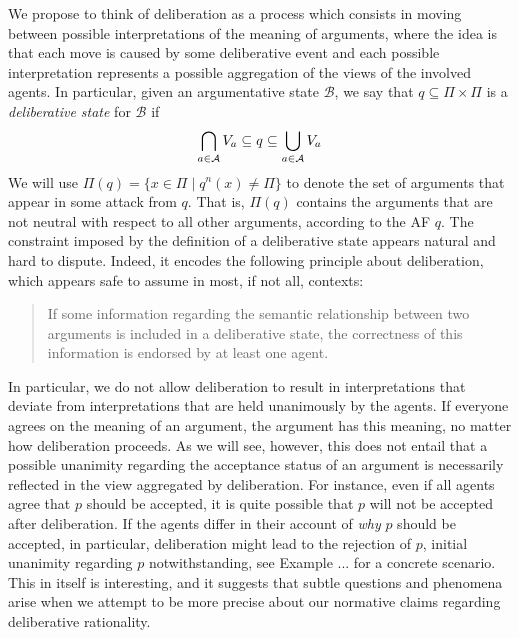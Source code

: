 \documentclass{article}
\newcommand{\neu}[2]{#1^n(#2)}
\newcommand{\views}{\mathcal B}
\begin{document}
We propose to think of deliberation as a process which consists in moving between possible interpretations of the meaning of arguments, where the idea is that each move is caused by some deliberative event and each possible interpretation represents a possible aggregation of the views of the involved agents. In particular, given an argumentative state $\views$, we say that $q \subseteq \Pi \times \Pi$ is a \emph{deliberative state} for $\views$ if
\begin{equation}\label{eq:ds}
\bigcap_{a \in \mathcal A}V_a \subseteq q \subseteq \bigcup_{a \in \mathcal A}V_a
\end{equation}
We will use $\Pi(q) = \{x \in \Pi \mid \neu q x \not = \Pi\}$ to denote the set of arguments that appear in some attack from $q$. That is, $\Pi(q)$ contains the arguments that are not neutral with respect to all other arguments, according to the AF $q$. The constraint imposed by the definition of a deliberative state appears natural and hard to dispute. Indeed, it encodes the following principle about deliberation, which appears safe to assume in most, if not all, contexts:

\begin{quote}\label{principle}
If some information regarding the semantic relationship between two arguments is included in a deliberative state, the correctness of this information is endorsed by at least one agent. 
\end{quote}

In particular, we do not allow deliberation to result in interpretations that deviate from interpretations that are held unanimously by the agents. If everyone agrees on the meaning of an argument, the argument has this meaning, no matter how deliberation proceeds. As we will see, however, this does not entail that a possible  unanimity regarding the acceptance status of an argument is necessarily reflected in the view aggregated by deliberation. For instance, even if all agents agree that $p$ should be accepted, it is quite possible that $p$ will not be accepted after deliberation. If the agents differ in their account of \emph{why} $p$ should be accepted, in particular, deliberation might lead to the rejection of $p$, initial unanimity regarding $p$ notwithstanding, see Example ... for a concrete scenario. This in itself is interesting, and it suggests that subtle questions and phenomena arise when we attempt to be more precise about our normative claims regarding deliberative rationality.
\end{document}
